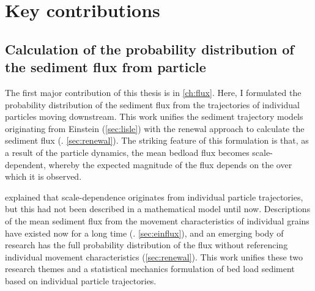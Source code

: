 \section{Key contributions}

\subsection{Calculation of the probability distribution of the sediment flux from \DIFdelbegin {}\DIFdelend \DIFaddbegin {}\DIFaddend particle \DIFdelbegin {}\DIFdelend \DIFaddbegin {}\DIFaddend }

The first major contribution of this thesis is in \DIFdelbegin {}\DIFdelend \DIFaddbegin {}\DIFaddend \ref{ch:flux}. Here, I formulated the probability distribution of the sediment flux from the trajectories of individual particles moving downstream. This work unifies the sediment trajectory models originating from Einstein (\DIFdelbegin {}\DIFdelend \DIFaddbegin {}\DIFaddend \ref{sec:lisle}) with the renewal approach to calculate the sediment flux (\DIFdelbegin {}\DIFdelend \DIFaddbegin {}\DIFaddend . \ref{sec:renewal}).
The striking feature of this formulation is that, as a result of the particle dynamics, the mean bedload flux becomes scale-dependent, whereby the expected magnitude of the flux depends on the \DIFdelbegin {}\DIFdelend \DIFaddbegin {}\DIFaddend over which it is observed.

\citet{Ballio2018} explained that scale-dependence originates from individual particle trajectories, but this had not been described in a mathematical model until now.
Descriptions of the mean sediment flux from the movement characteristics of individual grains have existed now for a long time (\DIFdelbegin {}\DIFdelend \DIFaddbegin {}\DIFaddend . \ref{sec:einflux}), and an emerging body of research has \DIFdelbegin {}\DIFdelend \DIFaddbegin {}\DIFaddend the full probability distribution of the flux \DIFdelbegin {}\DIFdelend without referencing individual movement characteristics (\DIFdelbegin {}\DIFdelend \DIFaddbegin {}\DIFaddend \ref{sec:renewal}). 
This work unifies these two research themes and \DIFdelbegin {}\DIFdelend \DIFaddbegin {}\DIFaddend a statistical mechanics formulation of \DIFaddbegin {}\DIFaddend bed load sediment \DIFdelbegin {}\DIFdelend \DIFaddbegin {}\DIFaddend based on individual particle trajectories.

